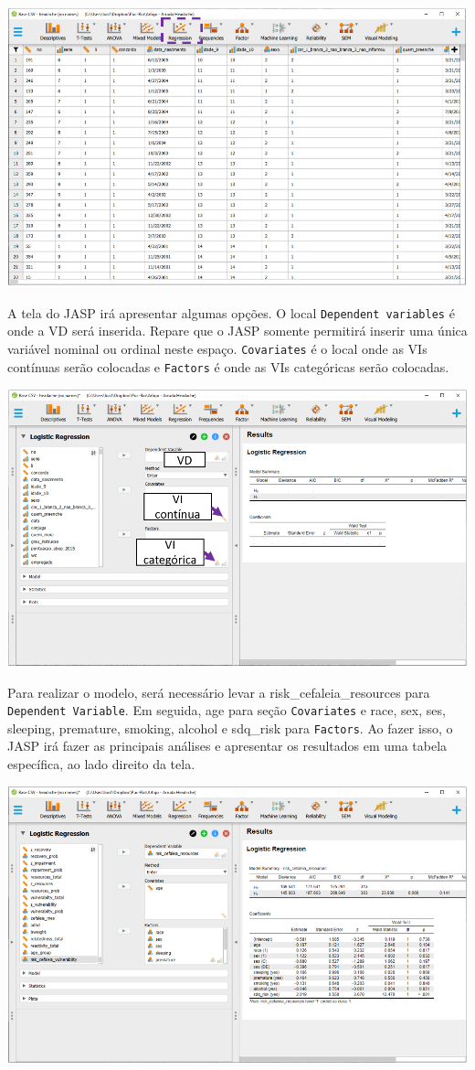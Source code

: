 \documentclass[
]{book}
\begin{document}
\includegraphics{./img/cap_logistica_regression.png}

A tela do JASP irá apresentar algumas opções. O local \texttt{Dependent\ variables} é onde a VD será inserida. Repare que o JASP somente permitirá inserir uma única variável nominal ou ordinal neste espaço. \texttt{Covariates} é o local onde as VIs contínuas serão colocadas e \texttt{Factors} é onde as VIs categóricas serão colocadas.

\includegraphics{./img/cap_logistica_interface.png}

Para realizar o modelo, será necessário levar a risk\_cefaleia\_resources para \texttt{Dependent\ Variable}. Em seguida, age para seção \texttt{Covariates} e race, sex, ses, sleeping, premature, smoking, alcohol e sdq\_risk para \texttt{Factors}. Ao fazer isso, o JASP irá fazer as principais análises e apresentar os resultados em uma tabela específica, ao lado direito da tela.

\includegraphics{./img/cap_logistica_resultado_0.png}
\end{document}
